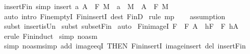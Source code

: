 \begin{isabellebody}
\isamarkupfalse%
%
\endisatagproof
{\isafoldproof}%
%
\isadelimproof
\isanewline
%
\endisadelimproof
\isanewline
\isanewline
{}\isamarkupfalse%
\ insert{\isacharunderscore}Fin\ {\isacharbrackleft}simp{\isacharbrackright}{\isacharcolon}\ {\isachardoublequoteopen}{\isacharparenleft}insert\ a\ A\ {\isacharcolon}\ {\isacharpercent}F\ M{\isacharparenright}\ {\isacharequal}\ {\isacharparenleft}a\ {\isacharcolon}\ M\ {\isacharampersand}\ A\ {\isacharcolon}\ {\isacharpercent}F\ M{\isacharparenright}{\isachardoublequoteclose}\isanewline
%
\isadelimproof
%
\endisadelimproof
%
\isatagproof
{}\isamarkupfalse%
\ {\isacharparenleft}auto\ intro{\isacharbang}{\isacharcolon}\ Fin{\isachardot}emptyI\ Fin{\isachardot}insertI\ dest{\isacharcolon}\ FinD{\isacharparenright}\isanewline
{}\isamarkupfalse%
\ {\isacharparenleft}rule\ mp{\isacharparenright}\isanewline
{}\isamarkupfalse%
\ {}\ \isanewline
{}\isamarkupfalse%
\ {\isacharparenleft}assumption{\isacharparenright}\isanewline
{}\isamarkupfalse%
\ {\isacharparenleft}subst\ insert{\isacharunderscore}is{\isacharunderscore}Un{\isacharparenright}\isanewline
{}\isamarkupfalse%
\ {\isacharparenleft}subst\ subset{\isacharunderscore}Fin{\isacharparenright}\isanewline
{}\isamarkupfalse%
\ auto\isanewline
{}\isamarkupfalse%
%
\endisatagproof
{\isafoldproof}%
%
\isadelimproof
\isanewline
%
\endisadelimproof
\isanewline
\isanewline
\isanewline
{}\isamarkupfalse%
\ Fin{\isacharunderscore}imageI{\isacharcolon}\ {\isachardoublequoteopen}F\ {\isacharcolon}\ {\isacharpercent}F\ A\ {\isacharequal}{\isacharequal}{\isachargreater}\ h{\isacharbackquote}F\ {\isacharcolon}\ {\isacharpercent}F\ {\isacharparenleft}h{\isacharbackquote}A{\isacharparenright}{\isachardoublequoteclose}\isanewline
%
\isadelimproof
%
\endisadelimproof
%
\isatagproof
{}\isamarkupfalse%
\ {\isacharparenleft}erule\ Fin{\isachardot}induct{\isacharparenright}\isanewline
{}\isamarkupfalse%
\ {\isacharparenleft}simp\ {\isacharparenleft}no{\isacharunderscore}asm{\isacharparenright}{\isacharparenright}\isanewline
{}\isamarkupfalse%
\ {\isacharparenleft}simp\ {\isacharparenleft}no{\isacharunderscore}asm{\isacharunderscore}simp{\isacharparenright}\ add{\isacharcolon}\ image{\isacharunderscore}eqI\ {\isacharbrackleft}THEN\ Fin{\isachardot}insertI{\isacharbrackright}\ image{\isacharunderscore}insert\ del{\isacharcolon}\ insert{\isacharunderscore}Fin{\isacharparenright}\isanewline

\end{isabellebody}
